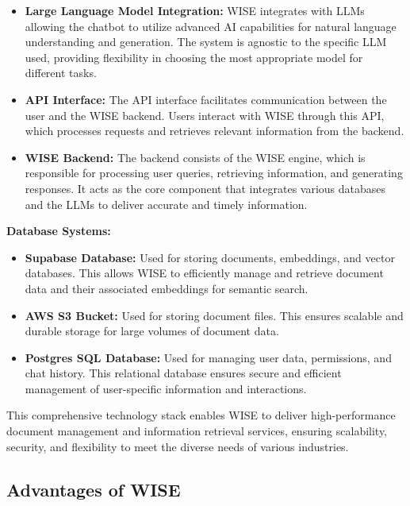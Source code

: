\begin{itemize}
    \item \textbf{Large Language Model Integration:} WISE integrates with LLMs allowing the chatbot to utilize advanced AI capabilities for natural language understanding and generation. The system is agnostic to the specific LLM used, providing flexibility in choosing the most appropriate model for different tasks.

    \item \textbf{API Interface:} The API interface facilitates communication between the user and the WISE backend. Users interact with WISE through this API, which processes requests and retrieves relevant information from the backend.

    \item \textbf{WISE Backend:} The backend consists of the WISE engine, which is responsible for processing user queries, retrieving information, and generating responses. It acts as the core component that integrates various databases and the LLMs to deliver accurate and timely information.
\end{itemize}

\textbf{Database Systems:} 

    \begin{itemize}
        \item \textbf{Supabase Database:} Used for storing documents, embeddings, and vector databases. This allows WISE to efficiently manage and retrieve document data and their associated embeddings for semantic search.
        \item \textbf{AWS S3 Bucket:} Used for storing document files. This ensures scalable and durable storage for large volumes of document data.
        \item \textbf{Postgres SQL Database:} Used for managing user data, permissions, and chat history. This relational database ensures secure and efficient management of user-specific information and interactions. \cite{hpa2024}
    \end{itemize}

This comprehensive technology stack enables WISE to deliver high-performance document management and information retrieval services, ensuring scalability, security, and flexibility to meet the diverse needs of various industries.

\subsection{Advantages of WISE}

